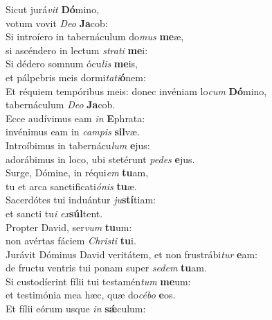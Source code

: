 \evenverse Sicut jurá\textit{vit} \textbf{Dó}mino,~\*\\
\evenverse votum vovit \textit{De}\textit{o} \textbf{Ja}cob:\\
\oddverse Si introíero in tabernáculum do\textit{mus} \textbf{me}æ,~\*\\
\oddverse si ascéndero in lectum \textit{stra}\textit{ti} \textbf{me}i:\\
\evenverse Si dédero somnum ócu\textit{lis} \textbf{me}is,~\*\\
\evenverse et pálpebris meis dormi\textit{ta}\textit{ti}\textbf{ó}nem:\\
\oddverse Et réquiem tempóribus meis: donec invéniam lo\textit{cum} \textbf{Dó}mino,~\*\\
\oddverse tabernáculum \textit{De}\textit{o} \textbf{Ja}cob.\\
\evenverse Ecce audívimus eam \textit{in} \textbf{E}phrata:~\*\\
\evenverse invénimus eam in \textit{cam}\textit{pis} \textbf{sil}væ.\\
\oddverse Introíbimus in tabernácu\textit{lum} \textbf{e}jus:~\*\\
\oddverse adorábimus in loco, ubi stetérunt \textit{pe}\textit{des} \textbf{e}jus.\\
\evenverse Surge, Dómine, in réqui\textit{em} \textbf{tu}am,~\*\\
\evenverse tu et arca sanctificati\textit{ó}\textit{nis} \textbf{tu}æ.\\
\oddverse Sacerdótes tui induántur \textit{ju}\textbf{stí}tiam:~\*\\
\oddverse et sancti tu\textit{i} \textit{ex}\textbf{súl}tent.\\
\evenverse Propter David, ser\textit{vum} \textbf{tu}um:~\*\\
\evenverse non avértas fáciem \textit{Chri}\textit{sti} \textbf{tu}i.\\
\oddverse Jurávit Dóminus David veritátem, et non frustrábi\textit{tur} \textbf{e}am:~\*\\
\oddverse de fructu ventris tui ponam super \textit{se}\textit{dem} \textbf{tu}am.\\
\evenverse Si custodíerint fílii tui testamén\textit{tum} \textbf{me}um:~\*\\
\evenverse et testimónia mea hæc, quæ do\textit{cé}\textit{bo} \textbf{e}os.\\
\oddverse Et fílii eórum usque \textit{in} \textbf{sǽ}culum:~\*\\

